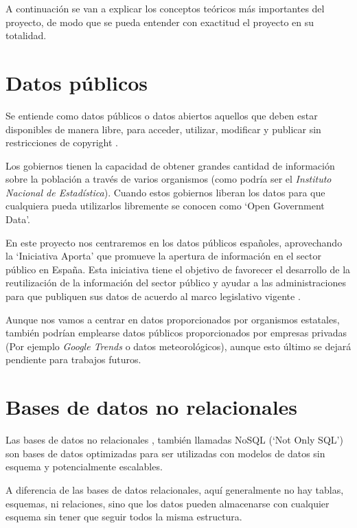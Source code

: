 
A continuación se van a explicar los conceptos teóricos más importantes del proyecto, de modo que se pueda entender con exactitud el proyecto en su totalidad.

\section{Datos públicos}

Se entiende como datos públicos o datos abiertos aquellos que deben estar disponibles de manera libre, para acceder, utilizar, modificar y publicar sin restricciones de copyright \cite{misc:datospublicos}.

Los gobiernos tienen la capacidad de obtener grandes cantidad de información sobre la población a través de varios organismos (como podría ser el \textit{Instituto Nacional de Estadística}). Cuando estos gobiernos liberan los datos para que cualquiera pueda utilizarlos libremente se conocen como `Open Government Data'.

En este proyecto nos centraremos en los datos públicos españoles, aprovechando la `Iniciativa Aporta' que promueve la apertura de información en el sector público en España. Esta iniciativa tiene el objetivo de favorecer el desarrollo de la reutilización de la información del sector público y ayudar a las administraciones para que publiquen sus datos de acuerdo al marco legislativo vigente \cite{misc:iniciativaaporta}.

Aunque nos vamos a centrar en datos proporcionados por organismos estatales, también podrían emplearse datos públicos proporcionados por empresas privadas (Por ejemplo \textit{Google Trends} o datos meteorológicos), aunque esto último se dejará pendiente para trabajos futuros.

\section{Bases de datos no relacionales}

Las bases de datos no relacionales \cite{wiki:nosql}, también llamadas NoSQL (`Not Only SQL') son bases de datos optimizadas para ser utilizadas con modelos de datos sin esquema y potencialmente escalables.

A diferencia de las bases de datos relacionales, aquí generalmente no hay tablas, esquemas, ni relaciones, sino que los datos pueden almacenarse con cualquier esquema sin tener que seguir todos la misma estructura.

